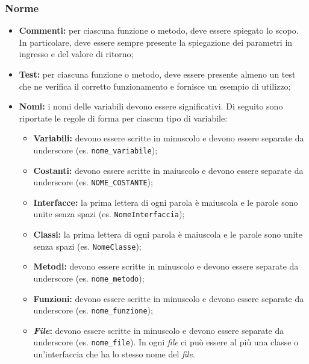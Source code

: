 \subsubsection*{Norme}
\begin{itemize}
	\item \textbf{Commenti:} per ciascuna funzione o metodo, deve essere
	      spiegato lo scopo. In particolare, deve essere sempre presente la
	      spiegazione dei parametri in ingresso e del valore di ritorno;

	\item \textbf{Test:} per ciascuna funzione o metodo, deve essere presente
	      almeno un test che ne verifica il corretto funzionamento e fornisce un
	      esempio di utilizzo;

	\item \textbf{Nomi:} i nomi delle variabili devono essere significativi. 
		  Di seguito sono riportate le regole di forma per ciascun tipo di variabile:
	      \begin{itemize}
		      \item \textbf{Variabili:} devono essere scritte in minuscolo e
		            devono essere separate da underscore (es.
		            \texttt{nome\_variabile});
		      \item \textbf{Costanti:} devono essere scritte in maiuscolo e
		            devono essere separate da underscore (es.
		            \texttt{NOME\_COSTANTE});
		      \item \textbf{Interfacce:} la prima lettera di ogni parola è
		            maiuscola e le parole sono unite senza spazi (es.
		            \texttt{NomeInterfaccia});
		      \item \textbf{Classi:} la prima lettera di ogni parola è
		            maiuscola e le parole sono unite senza spazi (es.
		            \texttt{NomeClasse});
		      \item \textbf{Metodi:} devono essere scritte in minuscolo e
		            devono essere separate da underscore (es.
		            \texttt{nome\_metodo});
		      \item \textbf{Funzioni:} devono essere scritte in minuscolo e
		            devono essere separate da underscore (es.
		            \texttt{nome\_funzione});
		      \item \textbf{\textit{File}:} devono essere scritte in minuscolo e
		            devono essere separate da underscore (es.
		            \texttt{nome\_file}). In ogni \textit{file} ci può essere al
		            più una classe o un'interfaccia che ha lo stesso nome del
		            \textit{file}.
	      \end{itemize}
\end{itemize}

